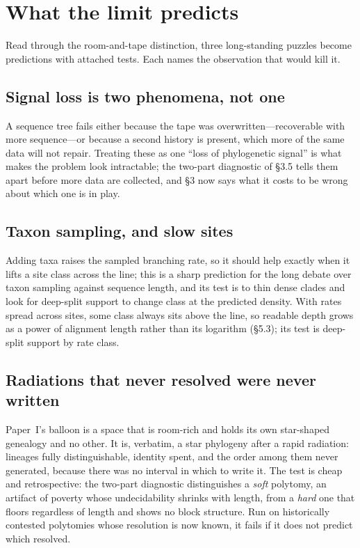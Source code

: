 \documentclass[11pt]{article}
\begin{document}
\section{What the limit predicts}

Read through the room-and-tape distinction, three long-standing puzzles become predictions with attached tests. Each names the observation that would kill it.

\subsection{Signal loss is two phenomena, not one}
A sequence tree fails either because the tape was overwritten---recoverable with more sequence---or because a second history is present, which more of the same data will not repair. Treating these as one ``loss of phylogenetic signal'' is what makes the problem look intractable; the two-part diagnostic of \S3.5 tells them apart before more data are collected, and \S3 now says what it costs to be wrong about which one is in play.

\subsection{Taxon sampling, and slow sites}
Adding taxa raises the sampled branching rate, so it should help exactly when it lifts a site class across the line; this is a sharp prediction for the long debate over taxon sampling against sequence length, and its test is to thin dense clades and look for deep-split support to change class at the predicted density. With rates spread across sites, some class always sits above the line, so readable depth grows as a power of alignment length rather than its logarithm (\S5.3); its test is deep-split support by rate class.

\subsection{Radiations that never resolved were never written}
Paper~I's balloon is a space that is room-rich and holds its own star-shaped genealogy and no other. It is, verbatim, a star phylogeny after a rapid radiation: lineages fully distinguishable, identity spent, and the order among them never generated, because there was no interval in which to write it. The test is cheap and retrospective: the two-part diagnostic distinguishes a \emph{soft} polytomy, an artifact of poverty whose undecidability shrinks with length, from a \emph{hard} one that floors regardless of length and shows no block structure. Run on historically contested polytomies whose resolution is now known, it fails if it does not predict which resolved.
\end{document}
